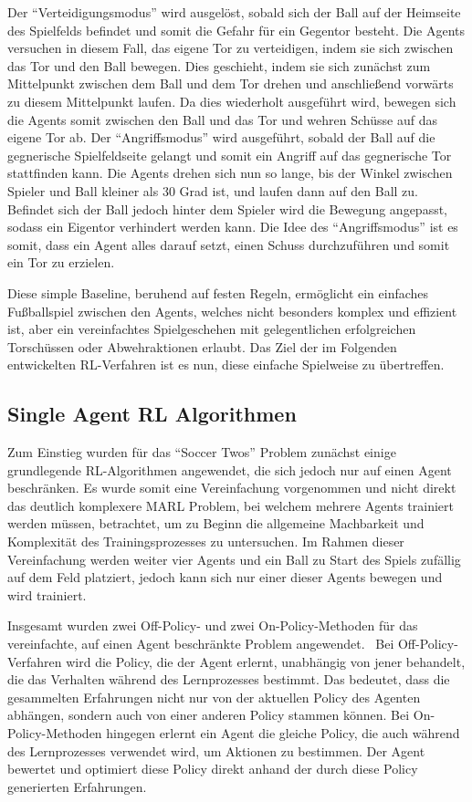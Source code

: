 \documentclass[twocolumn]{webofc}
\begin{document}
Der \enquote{Verteidigungsmodus} wird ausgelöst, sobald sich der Ball auf der Heimseite des Spielfelds befindet und somit die Gefahr für ein Gegentor besteht. Die Agents versuchen in diesem Fall, das eigene Tor zu verteidigen, indem sie sich zwischen das Tor und den Ball bewegen. Dies geschieht, indem sie sich zunächst zum Mittelpunkt zwischen dem Ball und dem Tor drehen und anschließend vorwärts zu diesem Mittelpunkt laufen. Da dies wiederholt ausgeführt wird, bewegen sich die Agents somit zwischen den Ball und das Tor und wehren Schüsse auf das eigene Tor ab.
Der \enquote{Angriffsmodus} wird ausgeführt, sobald der Ball auf die gegnerische Spielfeldseite gelangt und somit ein Angriff auf das gegnerische Tor stattfinden kann. Die Agents drehen sich nun so lange, bis der Winkel zwischen Spieler und Ball kleiner als 30 Grad ist, und laufen dann auf den Ball zu. Befindet sich der Ball jedoch hinter dem Spieler wird die Bewegung angepasst, sodass ein Eigentor verhindert werden kann. Die Idee des \enquote{Angriffsmodus} ist es somit, dass ein Agent alles darauf setzt, einen Schuss durchzuführen und somit ein Tor zu erzielen.

Diese simple Baseline, beruhend auf festen Regeln, ermöglicht ein einfaches Fußballspiel zwischen den Agents, welches nicht besonders komplex und effizient ist, aber ein vereinfachtes Spielgeschehen mit gelegentlichen erfolgreichen Torschüssen oder Abwehraktionen erlaubt. Das Ziel der im Folgenden entwickelten \ac{RL}-Verfahren ist es nun, diese einfache Spielweise zu übertreffen.


\subsection{Single Agent RL Algorithmen}

Zum Einstieg wurden für das \enquote{Soccer Twos} Problem zunächst einige grundlegende \ac{RL}-Algorithmen angewendet, die sich jedoch nur auf einen Agent beschränken. Es wurde somit eine Vereinfachung vorgenommen und nicht direkt das deutlich komplexere \ac{MARL} Problem, bei welchem mehrere Agents trainiert werden müssen, betrachtet, um zu Beginn die allgemeine Machbarkeit und Komplexität des Trainingsprozesses zu untersuchen. Im Rahmen dieser Vereinfachung werden weiter vier Agents und ein Ball zu Start des Spiels zufällig auf dem Feld platziert, jedoch kann sich nur einer dieser Agents bewegen und wird trainiert. 

Insgesamt wurden zwei Off-Policy- und zwei On-Policy-Methoden für das vereinfachte, auf einen Agent beschränkte Problem angewendet. 
Bei Off-Policy-Verfahren wird die Policy, die der Agent erlernt, unabhängig von jener behandelt, die das Verhalten während des Lernprozesses bestimmt. Das bedeutet, dass die gesammelten Erfahrungen nicht nur von der aktuellen Policy des Agenten abhängen, sondern auch von einer anderen Policy stammen können.
Bei On-Policy-Methoden hingegen erlernt ein Agent die gleiche Policy, die auch während des Lernprozesses verwendet wird, um Aktionen zu bestimmen. Der Agent bewertet und optimiert diese Policy direkt anhand der durch diese Policy generierten Erfahrungen.
\end{document}
